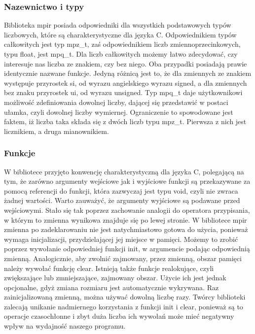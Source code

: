 \documentclass[twoside,a4paper]{book}
\begin{document}
\subsubsection{Nazewnictwo i typy}

Biblioteka mpir posiada odpowiedniki dla wszystkich podstawowych typów liczbowych, które są charakterystyczne dla języka C. Odpowiednikiem typów całkowitych jest typ mpz\_t, zaś odpowiednikiem liczb zmiennoprzecinkowych, typu float, jest mpq\_t. Dla liczb całkowitych możemy łatwo zdecydować, czy interesuje nas liczba ze znakiem, czy bez niego. Oba przypadki posiadają prawie identycznie nazwane funkcje. Jedyną różnicą jest to, że dla zmiennych ze znakiem występuje przyrostek si, od wyrazu angielskiego wyrazu signed, a dla zmiennych bez znaku przyrostek ui, od wyrazu unsigned. Typ mpq\_t daje użytkownikowi możliwość zdefiniowania dowolnej liczby, dającej się przedstawić w postaci ułamka, czyli dowolnej liczby wymiernej. Ograniczenie to spowodowane jest faktem, iż liczba taka składa się z dwóch liczb typu mpz\_t. Pierwsza z nich jest licznikiem, a druga mianownikiem.

\subsubsection{Funkcje}
W bibliotece przyjęto konwencję charakterystyczną dla języka C, polegającą na tym, że zarówno argumenty wejściowe jak i wyjściowe funkcji są przekazywane za pomocą referencji do funkcji, która zazwyczaj jest typu void, czyli nie zwraca żadnej wartości. Warto zauważyć, że argumenty wyjściowe są podawane przed wejściowymi. Stało się tak poprzez zachowanie analogii do operatora przypisania, w którym to zmienna wynikowa znajduje się po lewej stronie.
W bibliotece mpir zmienna po zadeklarowaniu nie jest natychmiastowo gotowa do użycia, ponieważ wymaga inicjalizacji, przydzielającej jej miejsce w pamięci. Możemy to zrobić poprzez wywołanie odpowiedniej funkcji init, w argumencie podając odpowiednią zmienną. Analogicznie, aby zwolnić zajmowany, przez zmienną, obszar pamięci należy wywołać funkcję clear. Istnieją także funkcje realokujące, czyli zwiększające lub zmniejszające, zajmowany obszar. Użycie ich jest jednak opcjonalne, gdyż zmiana rozmiaru jest automatycznie wykrywana. Raz zainicjalizowaną zmienną, można używać dowolną liczbę razy. Twórcy biblioteki zalecają unikanie nadmiernego korzystania z funkcji init i clear, ponieważ są to operacje czasochłonne i zbyt duża liczba ich wywołań może mieć negatywny wpływ na wydajność naszego programu.
\end{document}
